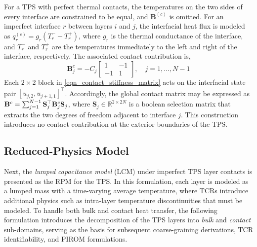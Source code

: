 For a TPS with perfect thermal contacts, the temperatures on the two sides of every interface are constrained to be equal, and $\boldsymbol{B}^{(c)}$ is omitted. For an imperfect interface $r$ between layers $i$ and $j$, the interfacial heat flux is modeled as $q^{(c)}_{r} = g_r\left(T_r^{-} - T_r^{+}\right)$, where $g_r$ is the thermal conductance of the interface, and $T_r^{-}$ and $T_r^{+}$ are the temperatures immediately to the left and right of the interface, respectively. The associated contact contribution is,
\begin{equation}
    \boldsymbol{B}^{c}_j = -C_j
    \begin{bmatrix}
        1 & -1\\
        -1 & 1
    \end{bmatrix},\quad j=1,\ldots,N-1\label{eqn_contact_stiffness_matrix}
\end{equation}
Each \(2\times2\) block in \eqref{eqn_contact_stiffness_matrix} acts on the interfacial state pair
\([u_{j,2},u_{j+1,1}]^{\top}\). Accordingly, the global contact matrix may be expressed as $\mathbf{B}^c = \sum_{j=1}^{N-1} \mathbf{S}_j^\top \mathbf{B}^c_j \mathbf{S}_j$, where \(\boldsymbol{S}_j\in\mathbb{R}^{2\times2N}\) is a boolean selection matrix that extracts the two degrees of freedom adjacent to interface \(j\). This construction introduces no contact contribution at the exterior boundaries of the TPS.

\subsection{Reduced-Physics Model}

Next, the \emph{lumped capacitance model} (LCM) under imperfect TPS layer contacts is presented as the RPM for the TPS. In this formulation, each layer is modeled as a lumped mass with a time-varying average temperature, where TCRs introduce additional physics such as intra-layer temperature discontinuities that must be modeled. To handle both bulk and contact heat transfer, the following formulation introduces the decomposition of the TPS layers into \emph{bulk} and \emph{contact} sub-domains, serving as the basis for subsequent coarse-graining derivations, TCR identifiability, and PIROM formulations.

